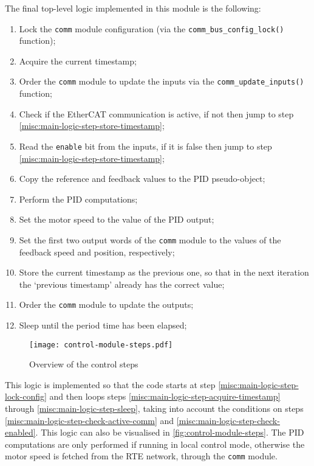 The final top-level logic implemented in this module is the following:

\begin{enumerate}
	\item Lock the \verb|comm| module configuration (via the \lstinline[columns=fixed]|comm_bus_config_lock()| function); \label{misc:main-logic-step-lock-config}
	\item Acquire the current timestamp; \label{misc:main-logic-step-acquire-timestamp}
	\item Order the \verb|comm| module to update the inputs via the \lstinline[columns=fixed]|comm_update_inputs()| function;
	\item Check if the EtherCAT communication is active, if not then jump to step \ref{misc:main-logic-step-store-timestamp}; \label{misc:main-logic-step-check-active-comm}
	\item Read the \verb|enable| bit from the inputs, if it is false then jump to step \ref{misc:main-logic-step-store-timestamp}; \label{misc:main-logic-step-check-enabled}
	\item Copy the reference and feedback values to the PID pseudo-object;
	\item Perform the PID computations;
	\item Set the motor speed to the value of the PID output;
	\item Set the first two output words of the \verb|comm| module to the values of the feedback speed and position, respectively; \label{misc:main-logic-step-update-outputs}
	\item Store the current timestamp as the previous one, so that in the next iteration the `previous timestamp' already has the correct value; \label{misc:main-logic-step-store-timestamp}
	\item Order the \verb|comm| module to update the outputs;
	\item Sleep until the period time has been elapsed; \label{misc:main-logic-step-sleep}
\end{enumerate}

\begin{figure}[htp]
	\centering
	\texttt{[image: control-module-steps.pdf]}
	\caption{Overview of the control steps}
	\label{fig:control-module-steps}
\end{figure}

This logic is implemented so that the code starts at step \ref{misc:main-logic-step-lock-config} and then loops steps \ref{misc:main-logic-step-acquire-timestamp} through \ref{misc:main-logic-step-sleep}, taking into account the conditions on steps \ref{misc:main-logic-step-check-active-comm} and \ref{misc:main-logic-step-check-enabled}.
This logic can also be visualised in \autoref{fig:control-module-steps}.
The PID computations are only performed if running in local control mode, otherwise the motor speed is fetched from the RTE network, through the \verb|comm| module. 

